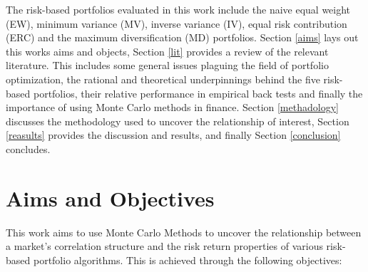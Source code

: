 \documentclass[11pt,preprint, authoryear]{elsarticle}
\numberwithin{equation}{section}
\numberwithin{figure}{section}
\numberwithin{table}{section}
\begin{document}
The risk-based portfolios evaluated in this work include the naive equal
weight (EW), minimum variance (MV), inverse variance (IV), equal risk
contribution (ERC) and the maximum diversification (MD) portfolios.
Section \ref{aims} lays out this works aims and objects, Section
\ref{lit} provides a review of the relevant literature. This includes
some general issues plaguing the field of portfolio optimization, the
rational and theoretical underpinnings behind the five risk-based
portfolios, their relative performance in empirical back tests and
finally the importance of using Monte Carlo methods in finance. Section
\ref{methadology} discusses the methodology used to uncover the
relationship of interest, Section \ref{reasults} provides the discussion
and results, and finally Section \ref{conclusion} concludes.

\hypertarget{aims-and-objectives}{%
\section{\texorpdfstring{Aims and Objectives
\label{aims}}{Aims and Objectives }}\label{aims-and-objectives}}

This work aims to use Monte Carlo Methods to uncover the relationship
between a market's correlation structure and the risk return properties
of various risk-based portfolio algorithms. This is achieved through the
following objectives:
\end{document}
